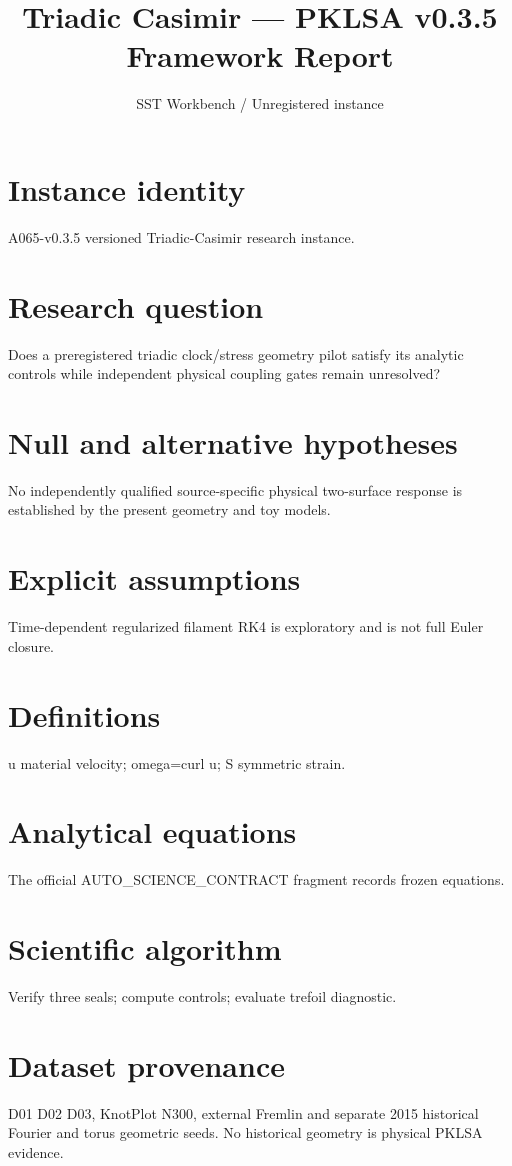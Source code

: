 \documentclass[10pt,a4paper]{article}
\title{Triadic Casimir --- PKLSA v0.3.5 Framework Report}
\author{SST Workbench / Unregistered instance}
\begin{document}
\maketitle
\section{Instance identity}
A065-v0.3.5 versioned Triadic-Casimir research instance.
\section{Research question}
Does a preregistered triadic clock/stress geometry pilot satisfy its analytic controls while independent physical coupling gates remain unresolved?
\section{Null and alternative hypotheses}
No independently qualified source-specific physical two-surface response is established by the present geometry and toy models.
\section{Explicit assumptions}
Time-dependent regularized filament RK4 is exploratory and is not full Euler closure.
\section{Definitions}
u material velocity; omega=curl u; S symmetric strain.
\section{Analytical equations}
The official AUTO\_SCIENCE\_CONTRACT fragment records frozen equations.

\section{Scientific algorithm}
Verify three seals; compute controls; evaluate trefoil diagnostic.
\section{Dataset provenance}
D01 D02 D03, KnotPlot N300, external Fremlin and separate 2015 historical Fourier and torus geometric seeds. No historical geometry is physical PKLSA evidence.
\end{document}

